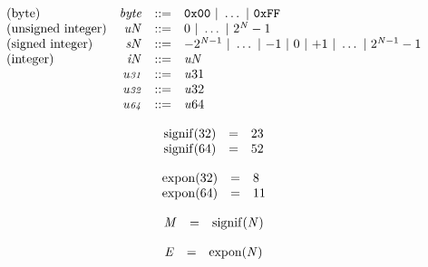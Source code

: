 \vspace{1ex}

\vspace{1ex}

$$
\begin{array}{@{}lrrl@{}l@{}}
\mbox{(byte)} & {\mathit{byte}} &::=& \mathtt{0x00} ~|~ \dots ~|~ \mathtt{0xFF} \\
\mbox{(unsigned integer)} & {{\mathit{u}}}{{\mathit{N}}} &::=& 0 ~|~ \dots ~|~ {2^{{\mathit{N}}}} - 1 \\
\mbox{(signed integer)} & {{\mathit{s}}}{{\mathit{N}}} &::=& {-{2^{{\mathit{N}} - 1}}} ~|~ \dots ~|~ {-1} ~|~ 0 ~|~ {+1} ~|~ \dots ~|~ {2^{{\mathit{N}} - 1}} - 1 \\
\mbox{(integer)} & {{\mathit{i}}}{{\mathit{N}}} &::=& {{\mathit{u}}}{{\mathit{N}}} \\
& {\mathit{u{\scriptstyle31}}} &::=& {{\mathit{u}}}{31} \\
& {\mathit{u{\scriptstyle32}}} &::=& {{\mathit{u}}}{32} \\
& {\mathit{u{\scriptstyle64}}} &::=& {{\mathit{u}}}{64} \\
\end{array}
$$

\vspace{1ex}

$$
\begin{array}{@{}lcl@{}l@{}}
{\mathrm{signif}}(32) &=& 23 &  \\
{\mathrm{signif}}(64) &=& 52 &  \\
\end{array}
$$

$$
\begin{array}{@{}lcl@{}l@{}}
{\mathrm{expon}}(32) &=& 8 &  \\
{\mathrm{expon}}(64) &=& 11 &  \\
\end{array}
$$

$$
\begin{array}{@{}lcl@{}l@{}}
{\mathit{M}} &=& {\mathrm{signif}}({\mathit{N}}) &  \\
\end{array}
$$

$$
\begin{array}{@{}lcl@{}l@{}}
{\mathit{E}} &=& {\mathrm{expon}}({\mathit{N}}) &  \\
\end{array}
$$

